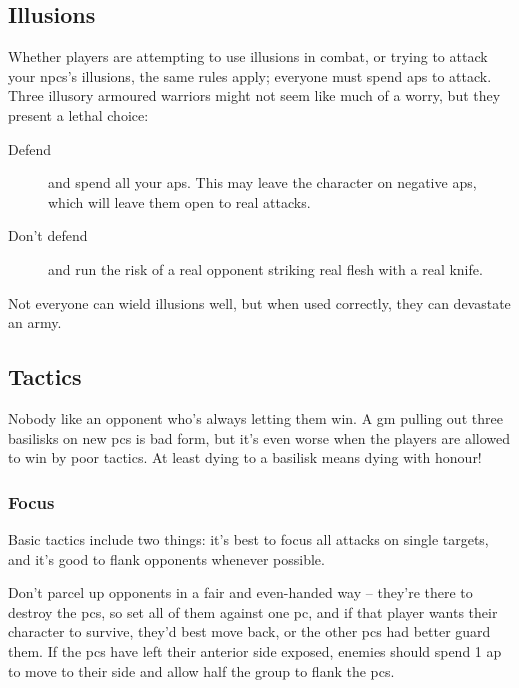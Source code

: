 \begin{multicols}{2}
\subsection{Illusions}

Whether players are attempting to use illusions in combat, or trying to attack your \glspl{npc}'s illusions, the same rules apply; everyone must spend \glspl{ap} to attack.
Three illusory armoured warriors might not seem like much of a worry, but they present a lethal choice:

\begin{description}
  \item[Defend]
  and spend all your \glspl{ap}.
  This may leave the character on negative \glspl{ap}, which will leave them open to real attacks.
  \item[Don't defend]
  and run the risk of a real opponent striking real flesh with a real knife. 
\end{description}

Not everyone can wield illusions well, but when used correctly, they can devastate an army.

\subsection{Tactics}

Nobody like an opponent who's always letting them win.
A \gls{gm} pulling out three basilisks on new \glspl{pc} is bad form, but it's even worse when the players are allowed to win by poor tactics.
At least dying to a basilisk means dying with honour!

\subsubsection{Focus}

Basic tactics include two things: it's best to focus all attacks on single targets, and it's good to flank opponents whenever possible.

Don't parcel up opponents in a fair and even-handed way -- they're there to destroy the \glspl{pc}, so set all of them against one \gls{pc}, and if that player wants their character to survive, they'd best move back, or the other \glspl{pc} had better guard them.%
If the \glspl{pc} have left their anterior side exposed, enemies should spend 1 \gls{ap} to move to their side and allow half the group to flank the \glspl{pc}.


\end{multicols}
